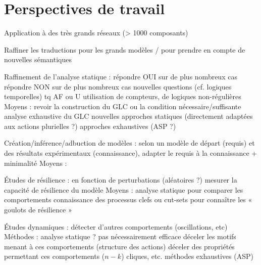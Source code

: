 \section{Perspectives de travail}

\TODO

Application à des très grands réseaux (> 1000 composants)

Raffiner les traductions pour les grands modèles / pour prendre en compte de nouvelles sémantiques

Raffinement de l'analyse statique :
  répondre OUI sur de plus nombreux cas
  répondre NON sur de plus nombreux cas
  nouvelles questions (cf. logiques temporelles) tq AF ou U
  utilisation de compteurs, de logiques non-régulières
Moyens :
  revoir la construction du GLC ou la condition nécessaire/suffisante
  analyse exhaustive du GLC
  nouvelles approches statiques (directement adaptées aux actions plurielles ?)
  approches exhaustives (ASP ?)

Création/inférence/adbuction de modèles :
  selon un modèle de départ (requis) et des résultats expérimentaux (connaissance),
    adapter le requis à la connaissance + minimalité
Moyens :
  
Études de résilience :
  en fonction de perturbations (aléatoires ?) mesurer la capacité de résilience du modèle
Moyens :
  analyse statique pour comparer les comportements
  connaissance des processus clefs ou cut-sets pour connaître les « goulots de résilience »

Études dynamiques :
  détecter d'autres comportements (oscillations, etc)
Méthodes :
  analyse statique ? pas nécessairement efficace
  déceler les motifs menant à ces comportements (structure des actions)
  déceler des propriétés permettant ces comportements ($n-k$) cliques, etc.
  méthodes exhaustives (ASP)


